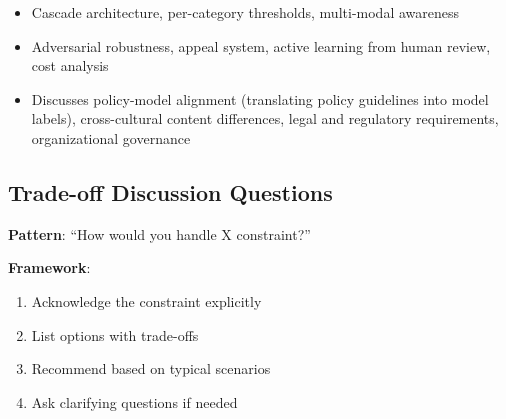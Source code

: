 \begin{interviewq}
\goodgreat
\begin{itemize}
    \item {} Cascade architecture, per-category thresholds, multi-modal awareness
    \item {} Adversarial robustness, appeal system, active learning from human review, cost analysis
    \item {} Discusses policy-model alignment (translating policy guidelines into model labels), cross-cultural content differences, legal and regulatory requirements, organizational governance
\end{itemize}

\end{interviewq}

\subsection{Trade-off Discussion Questions}

\textbf{Pattern}: ``How would you handle X constraint?''

\textbf{Framework}:
\begin{enumerate}
    \item Acknowledge the constraint explicitly
    \item List options with trade-offs
    \item Recommend based on typical scenarios
    \item Ask clarifying questions if needed
\end{enumerate}

